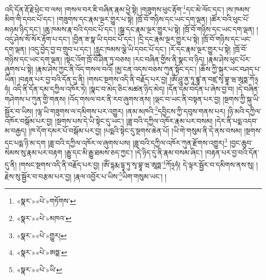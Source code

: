 འདི་དོན་རྡོ་རྗེ་ཕྲེང་བ་ལས། །གསལ་བར་ཇི་བཞིན་རྣམ་ཕྱེ་སྟེ། །གཟུགས་ཕུང་རྟོག་\footnote{«སྣར་»«པེ་»གཏོགས་}དང་མེ་ལོང་དང་། །ས་ཁམས་མིག་གི་དབང་པོ་དང་། །གཟུགས་དང་རྣམ་ལྔར་གྱུར་པ་སྟེ། །ཁྲོ་བོ་གཉིས་དང་ཡང་དག་ལྡན། །ཚོར་བའི་ཕུང་པོ་མཉམ་ཉིད་དང་། །ཆུ་ཁམས་རྣ་བའི་དབང་པོ་དང་། །སྒྲ་དང་རྣམ་ལྔར་གྱུར་པ་སྟེ། །ཁྲོ་བོ་གཉིས་དང་ཡང་དག་ལྡན། །འདུ་ཤེས་སོ་སོར་རྟོག་པ་དང་། །བྱིན་ཟ་སྣ་ཡི་དབང་པོ་དང་། །དྲི་དང་རྣམ་ལྔར་གྱུར་པ་སྟེ། །ཁྲོ་བོ་གཉིས་དང་ཡང་དག་ལྡན། །འདུ་བྱེད་བྱ་བ་གྲུབ་པ་དང་། །རླུང་ཁམས་ལྕེ་ཡི་དབང་པོ་དང་། །རོ་དང་རྣམ་ལྔར་གྱུར་པ་སྟེ། །ཁྲོ་བོ་གཉིས་དང་ཡང་དག་ལྡན། །སྟེང་འོག་ཁྲོ་བོ་ཤིན་ཏུ་བཅས། །རང་བཞིན་གྱིས་ནི་སྣང་བ་ཉིད། །རྣམ་ཤེས་ཕུང་པོར་ཞུགས་པ་སྟེ། །རྣམ་ཤེས་ཀྱང་ནི་འོད་གསལ་བའོ། །མྱ་ངན་འདས་བཅས་ཀུན་སྟོང་དང་། །ཆོས་ཀྱི་སྐུར་ཡང་བཤད་པ་ཡིན། །བརྟན་པར་བྱ་བའི་དོན་དུ་ནི། །གསང་སྔགས་འདི་ནི་བརྗོད་པར་བྱ། །ཨོཾ་ཤཱུ་ནྱ་ཏཱ་ཛྙཱ་ན་བཛྲ་སྭ་བྷཱ་ཝ་ཨཱཏྨ་ཀོ྅ཧཾ། འདི་ནི་དོན་དམ་དཀྱིལ་འཁོར་ཏེ། །སྣང་བ་མེད་ཅིང་མཚན་ཉིད་མེད། །དོན་དམ་བདེན་པ་ཞེས་བྱ་བ། །དེ་བཞིན་གཤེགས་པ་ཀུན་གྱི་གནས། །འོད་གསལ་བར་ནི་རབ་ཞུགས་ནས། །ལྡང་བ་ཡང་ནི་བསྟན་པར་བྱ། །སྔགས་ཀྱི་སྐུ་ཡི་སྦྱོར་བ་ཡིས། །ལྷ་ཡི་གཟུགས་ལ་དམིགས་པར་འགྱུར། །ནམ་མཁའི་\footnote{«སྣར་»«པེ་»མཁའ་}དབྱིངས་ཀྱི་དབུས་གནས་པར། །ཉི་མའི་དཀྱིལ་འཁོར་བསྒོམ་པར་བྱ། །སྔགས་པས་དེ་ཡི་སྟེང་དུ་ཡང་། །ཟླ་བའི་དཀྱིལ་འཁོར་རྣམ་པར་བསམ། །དེར་ནི་པདྨ་འདབ་མ་བརྒྱད། །ཁ་དོག་དམར་པོ་བསྒོམ་པར་བྱ། །པདྨའི་སྟེང་དུ་སྔགས་ཆེན་པོ། །ཡི་གེ་གསུམ་ནི་དེ་ནས་བསམ། །སྔགས་དང་པདྨ་ཉི་མ་དག །ཟླ་བའི་དཀྱིལ་འཁོར་ལ་ཞུགས་པས། །ཟླ་བའི་དཀྱིལ་འཁོར་ཀུན་རྫོགས་འགྱུར།\footnote{«སྣར་»«པེ་»གྱུར།} །བྱང་ཆུབ་སེམས་སུ་རྣམ་པར་བརྟག །རྒྱུ་དང་མི་རྒྱུ་ཐམས་ཅད་ཀྱང་། །དེ་ཉིད་དུ་ནི་རྣམ་བསམ་ཞིང་། །བརྟན་པར་བྱ་བའི་དོན་དུ་ནི། །གསང་སྔགས་འདི་ནི་བརྗོད་པར་བྱ། །ཨོཾ་དྷརྨ་དྷཱ་ཏུ་སྭ་བྷཱ་ཝ་ཨཱཏྨ་\footnote{«སྣར་»«པེ་»ཨཏྨ་}ཀོ྅ཧཾ། དེ་ལྟར་སྦྱོར་བ་དམིགས་ནས་སུ། །རྗེས་སུ་སྦྱོར་བ་བརྩམ་པར་བྱ། །རྣལ་འབྱོར་པ་ཡིས་\footnote{«སྣར་»«པེ་»ཡི་}ཡིག་གསུམ་ཡང་། །
